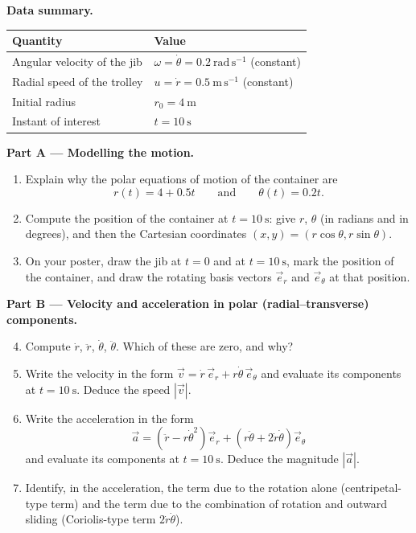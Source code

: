 \documentclass[11pt]{article}
\newcounter{popsec}
\newcounter{popsub}
\newcommand{\courssub}[1]{%
  \stepcounter{popsub}%
  \par\vspace{9pt}\noindent{\popxbold\fontsize{11.5}{13}\selectfont\color{popink}{\color{poporange}\thepopsec.\thepopsub}\hspace{6pt}#1}\par\nopagebreak\vspace{4pt}
}
\begin{document}
\textbf{Data summary.}

\begin{center}
\begin{tabularx}{\linewidth}{|l|X|}\hline
\rowcolor{popblueL} \textbf{Quantity} & \textbf{Value} \\ \hline
Angular velocity of the jib & $\omega = \dot{\theta} = 0.2\ \mathrm{rad\,s^{-1}}$ (constant) \\ \hline
Radial speed of the trolley & $u = \dot{r} = 0.5\ \mathrm{m\,s^{-1}}$ (constant) \\ \hline
Initial radius & $r_0 = 4\ \mathrm{m}$ \\ \hline
Instant of interest & $t = 10\ \mathrm{s}$ \\ \hline
\end{tabularx}
\end{center}

\courssub{Tasks}

\textbf{Part A — Modelling the motion.}

\begin{enumerate}
\item Explain why the polar equations of motion of the container are
\[ r(t) = 4 + 0.5t \qquad \text{and} \qquad \theta(t) = 0.2t . \]
\item Compute the position of the container at $t = 10\ \mathrm{s}$: give $r$, $\theta$ (in radians and in degrees), and then the Cartesian coordinates $(x, y) = (r\cos\theta, r\sin\theta)$.
\item On your poster, draw the jib at $t = 0$ and at $t = 10\ \mathrm{s}$, mark the position of the container, and draw the rotating basis vectors $\vec{e}_r$ and $\vec{e}_\theta$ at that position.
\end{enumerate}

\textbf{Part B — Velocity and acceleration in polar (radial--transverse) components.}

\begin{enumerate}
\setcounter{enumi}{3}
\item Compute $\dot{r}$, $\ddot{r}$, $\dot{\theta}$, $\ddot{\theta}$. Which of these are zero, and why?
\item Write the velocity in the form $\vec{v} = \dot{r}\,\vec{e}_r + r\dot{\theta}\,\vec{e}_\theta$ and evaluate its components at $t = 10\ \mathrm{s}$. Deduce the speed $|\vec{v}|$.
\item Write the acceleration in the form
\[ \vec{a} = \left(\ddot{r} - r\dot{\theta}^{2}\right)\vec{e}_r + \left(r\ddot{\theta} + 2\dot{r}\dot{\theta}\right)\vec{e}_\theta \]
and evaluate its components at $t = 10\ \mathrm{s}$. Deduce the magnitude $|\vec{a}|$.
\item Identify, in the acceleration, the term due to the rotation alone (centripetal-type term) and the term due to the combination of rotation and outward sliding (Coriolis-type term $2\dot{r}\dot{\theta}$).
\end{enumerate}
\end{document}
